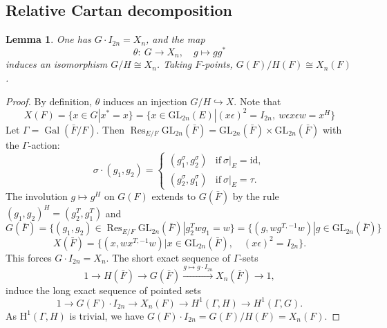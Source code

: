 \documentclass{amsart}
\newtheorem{lemma}[theorem]{Lemma}
\theoremstyle{definition}
\theoremstyle{remark}
\newcommand{\1}{\mathbf{1}}
\newcommand{\GL}{\mathrm{GL}}
\newcommand{\h}{\mathrm{H}}
\DeclareMathOperator{\Gal}{Gal}
\DeclareMathOperator{\Res}{Res}
\theoremstyle{definition}
\begin{document}
\subsection{Relative Cartan decomposition}
\begin{lemma}\label{F-points}One has $G\cdot I_{2n}=X_n$, and the map \[\theta:\ G\to X_n,\quad g\mapsto gg^*\] induces an isomorphism $ G/H\cong X_n$. Taking $F$-points, $ G(F)/H(F) \cong X_n(F)$.
\end{lemma}
\begin{proof}By definition, $\theta$ induces an injection $G/H\hookrightarrow X$. Note that \[X(F)=\{x\in G| x^*=x\}=\{x\in \GL_{2n}(E)| (x\epsilon)^2=I_{2n},\  w\epsilon  x \epsilon w=x^H\}\]
Let $\Gamma=\Gal(\bar{F}/F)$. Then $\Res_{E/F}\GL_{2n}(\bar{F})=\GL_{2n}(\bar{F})\times \GL_{2n}(\bar{F})$  with the   $\Gamma$-action: 
\[\sigma\cdot(g_1,g_2)=\begin{cases} (g_1^\sigma, g_2^\sigma) & \text{if}\  \sigma|_E=\mathrm{id},\\ (g_2^\sigma,g_1^\sigma) & \text{if}\ \sigma|_E=\tau.\end{cases}\]
 The involution $g\mapsto g^H$ on $G(F)$ extends to $G(\bar{F})$ by the rule $(g_1,g_2)^H=(g_2^T,g_1^T)$ and \[G(\bar{F})=\{(g_1,g_2)\in \Res_{E/F}\GL_{2n}(\bar{F})| g_2^T w g_1=w\}=\{(g, w g^{T,-1} w)| g\in \GL_{2n}(\bar{F})\}\]
 \[X(\bar{F})=\{(x, wx^{T,-1}w)| x\in \GL_{2n}(\bar{F}),\quad (x\epsilon)^2=I_{2n}\}.\]
 This forces $G\cdot I_{2n}=X_n$.  The short exact sequence of $\Gamma$-sets
\[1\to H(\bar{F})\to G(\bar{F})\xrightarrow{g\mapsto g\cdot I_{2n}} X_n(\bar{F})\to 1,\]
induce the long exact sequence of pointed sets 
\[1\to G(F)\cdot I_{2n}\to X_n(F)\to H^1(\Gamma, H)\to H^1(\Gamma, G).\]
As $\h^1(\Gamma, H)$ is trivial, we have $G(F)\cdot I_{2n}=G(F)/H(F)=X_n(F)$. 
 \end{proof}
\end{document}
